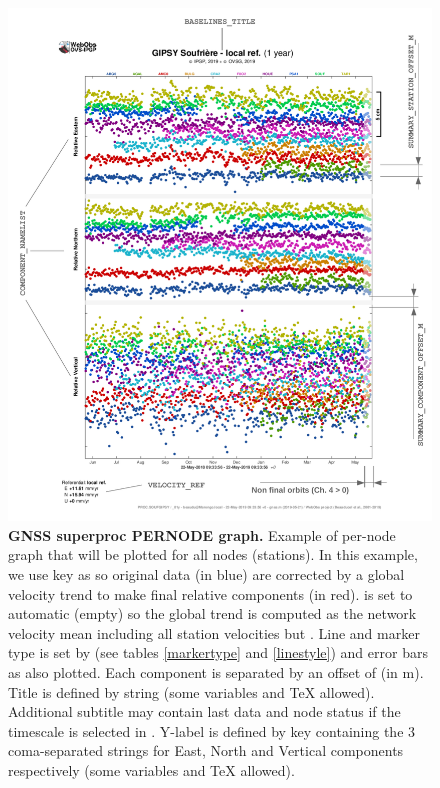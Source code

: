\begin{figure}
\centering
\includegraphics[width=\textwidth,page=2]{figures/gnss_superproc.pdf}
\caption{\textbf{GNSS superproc PERNODE graph.} Example of per-node graph that will be plotted for all nodes (stations). In this example, we use  key as  so original data (in blue) are corrected by a global velocity trend to make final relative components (in red).  is set to automatic (empty) so the global trend is computed as the network velocity mean including all station velocities but . Line and marker type is set by  (see tables \ref{markertype} and \ref{linestyle}) and error bars as also plotted. Each component is separated by an offset of  (in m). Title is defined by  string (some variables and TeX allowed). Additional subtitle may contain last data and node status if the timescale is selected in . Y-label is defined by  key containing the 3 coma-separated strings for East, North and Vertical components respectively (some variables and TeX allowed).}
\label{gnss_pernode}
\end{figure}

